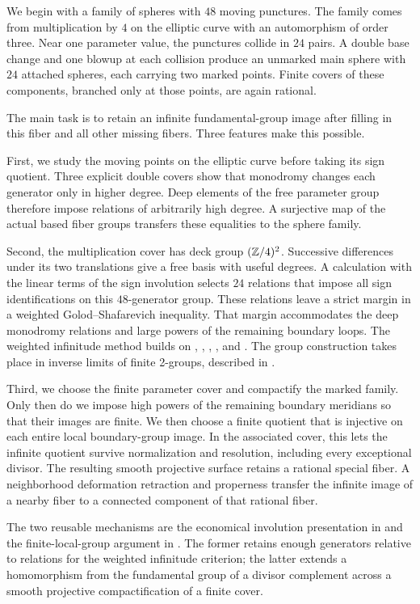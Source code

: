 We begin with a family of spheres with $48$ moving punctures. The family comes from multiplication by $4$ on the elliptic curve with an automorphism of order three. Near one parameter value, the punctures collide in $24$ pairs. A double base change and one blowup at each collision produce an unmarked main sphere with $24$ attached spheres, each carrying two marked points. Finite covers of these components, branched only at those points, are again rational.

The main task is to retain an infinite fundamental-group image after filling in this fiber and all other missing fibers. Three features make this possible.

First, we study the moving points on the elliptic curve before taking its sign quotient. Three explicit double covers show that monodromy changes each generator only in higher degree. Deep elements of the free parameter group therefore impose relations of arbitrarily high degree. A surjective map of the actual based fiber groups transfers these equalities to the sphere family.

Second, the multiplication cover has deck group $(\mathbb Z/4)^2$. Successive differences under its two translations give a free basis with useful degrees. A calculation with the linear terms of the sign involution selects $24$ relations that impose all sign identifications on this $48$-generator group. These relations leave a strict margin in a weighted Golod--Shafarevich inequality. That margin accommodates the deep monodromy relations and large powers of the remaining boundary loops. The weighted infinitude method builds on \citet{GolodShafarevich1964}, \citet{Golod1964}, \citet{Vinberg1965}, \citet{Ershov2011}, and \citet{ErshovJaikinZapirain2013}. The group construction takes place in inverse limits of finite 2-groups, described in .

Third, we choose the finite parameter cover and compactify the marked family. Only then do we impose high powers of the remaining boundary meridians so that their images are finite. We then choose a finite quotient that is injective on each entire local boundary-group image. In the associated cover, this lets the infinite quotient survive normalization and resolution, including every exceptional divisor. The resulting smooth projective surface retains a rational special fiber. A neighborhood deformation retraction and properness transfer the infinite image of a nearby fiber to a connected component of that rational fiber.

The two reusable mechanisms are the economical involution presentation in  and the finite-local-group argument in . The former retains enough generators relative to relations for the weighted infinitude criterion; the latter extends a homomorphism from the fundamental group of a divisor complement across a smooth projective compactification of a finite cover.

